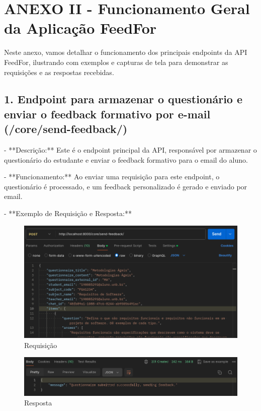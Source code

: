 \chapter*{ANEXO II - Funcionamento Geral da Aplicação FeedFor}
\label{anexoIIFGAF}

Neste anexo, vamos detalhar o funcionamento dos principais endpoints da API FeedFor, ilustrando com exemplos e capturas de tela para demonstrar as requisições e as respostas recebidas.

\section*{1. Endpoint para armazenar o questionário e enviar o feedback formativo por e-mail (/core/send-feedback/)}

- **Descrição:** Este é o endpoint principal da API, responsável por armazenar o questionário do estudante e enviar o feedback formativo para o email do aluno.

- **Funcionamento:** Ao enviar uma requisição para este endpoint, o questionário é processado, e um feedback personalizado é gerado e enviado por email.

- **Exemplo de Requisição e Resposta:**

\begin{figure}[H]
    \centering
    \includegraphics[width=1\textwidth]{figuras/send_report.png}
    \caption{Requisição}
    \label{fig:report_questions}
\end{figure}

\begin{figure}[H]
    \centering
    \includegraphics[width=1\textwidth]{figuras/send_report_result.png}
    \caption{Resposta}
    \label{fig:report_questions}
\end{figure}

